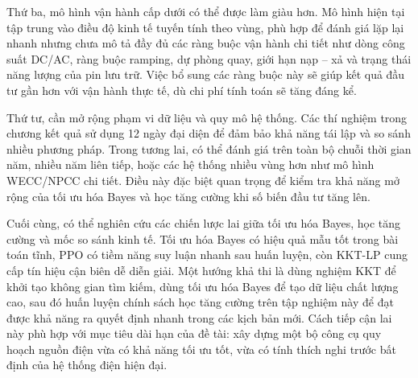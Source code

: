 Thứ ba, mô hình vận hành cấp dưới có thể được làm giàu hơn. Mô hình hiện tại tập trung vào điều độ kinh tế tuyến tính theo vùng, phù hợp để đánh giá lặp lại nhanh nhưng chưa mô tả đầy đủ các ràng buộc vận hành chi tiết như dòng công suất DC/AC, ràng buộc ramping, dự phòng quay, giới hạn nạp -- xả và trạng thái năng lượng của pin lưu trữ. Việc bổ sung các ràng buộc này sẽ giúp kết quả đầu tư gần hơn với vận hành thực tế, dù chi phí tính toán sẽ tăng đáng kể.

Thứ tư, cần mở rộng phạm vi dữ liệu và quy mô hệ thống. Các thí nghiệm trong chương kết quả sử dụng 12 ngày đại diện để đảm bảo khả năng tái lập và so sánh nhiều phương pháp. Trong tương lai, có thể đánh giá trên toàn bộ chuỗi thời gian năm, nhiều năm liên tiếp, hoặc các hệ thống nhiều vùng hơn như mô hình WECC/NPCC chi tiết. Điều này đặc biệt quan trọng để kiểm tra khả năng mở rộng của tối ưu hóa Bayes và học tăng cường khi số biến đầu tư tăng lên.

Cuối cùng, có thể nghiên cứu các chiến lược lai giữa tối ưu hóa Bayes, học tăng cường và mốc so sánh kinh tế. Tối ưu hóa Bayes có hiệu quả mẫu tốt trong bài toán tĩnh, PPO có tiềm năng suy luận nhanh sau huấn luyện, còn KKT-LP cung cấp tín hiệu cận biên dễ diễn giải. Một hướng khả thi là dùng nghiệm KKT để khởi tạo không gian tìm kiếm, dùng tối ưu hóa Bayes để tạo dữ liệu chất lượng cao, sau đó huấn luyện chính sách học tăng cường trên tập nghiệm này để đạt được khả năng ra quyết định nhanh trong các kịch bản mới. Cách tiếp cận lai này phù hợp với mục tiêu dài hạn của đề tài: xây dựng một bộ công cụ quy hoạch nguồn điện vừa có khả năng tối ưu tốt, vừa có tính thích nghi trước bất định của hệ thống điện hiện đại.
